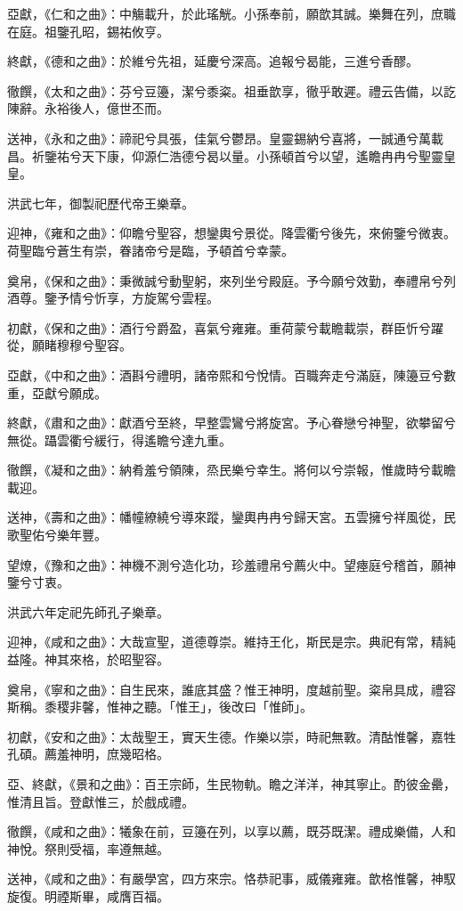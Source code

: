 亞獻，《仁和之曲》：中觴載升，於此瑤觥。小孫奉前，願歆其誠。樂舞在列，庶職在庭。祖鑒孔昭，錫祐攸亨。

終獻，《德和之曲》：於維兮先祖，延慶兮深高。追報兮曷能，三進兮香醪。

徹饌，《太和之曲》：芬兮豆籩，潔兮黍粢。祖垂歆享，徹乎敢遲。禮云告備，以訖陳辭。永裕後人，億世丕而。

送神，《永和之曲》：禘祀兮具張，佳氣兮鬱昂。皇靈錫納兮喜將，一誠通兮萬載昌。祈鑒祐兮天下康，仰源仁浩德兮曷以量。小孫頓首兮以望，遙瞻冉冉兮聖靈皇皇。

洪武七年，御製祀歷代帝王樂章。

迎神，《雍和之曲》：仰瞻兮聖容，想鑾輿兮景從。降雲衢兮後先，來俯鑒兮微衷。荷聖臨兮蒼生有崇，眷諸帝兮是臨，予頓首兮幸蒙。

奠帛，《保和之曲》：秉微誠兮動聖躬，來列坐兮殿庭。予今願兮效勤，奉禮帛兮列酒尊。鑒予情兮忻享，方旋駕兮雲程。

初獻，《保和之曲》：酒行兮爵盈，喜氣兮雍雍。重荷蒙兮載瞻載崇，群臣忻兮躍從，願睹穆穆兮聖容。

亞獻，《中和之曲》：酒斟兮禮明，諸帝熙和兮悅情。百職奔走兮滿庭，陳籩豆兮數重，亞獻兮願成。

終獻，《肅和之曲》：獻酒兮至終，早整雲鸞兮將旋宮。予心眷戀兮神聖，欲攀留兮無從。躡雲衢兮緩行，得遙瞻兮達九重。

徹饌，《凝和之曲》：納肴羞兮領陳，烝民樂兮幸生。將何以兮崇報，惟歲時兮載瞻載迎。

送神，《壽和之曲》：幡幢繚繞兮導來蹤，鑾輿冉冉兮歸天宮。五雲擁兮祥風從，民歌聖佑兮樂年豐。

望燎，《豫和之曲》：神機不測兮造化功，珍羞禮帛兮薦火中。望瘞庭兮稽首，願神鑒兮寸衷。

洪武六年定祀先師孔子樂章。

迎神，《咸和之曲》：大哉宣聖，道德尊崇。維持王化，斯民是宗。典祀有常，精純益隆。神其來格，於昭聖容。

奠帛，《寧和之曲》：自生民來，誰底其盛？惟王神明，度越前聖。粢帛具成，禮容斯稱。黍稷非馨，惟神之聽。「惟王」，後改曰「惟師」。

初獻，《安和之曲》：太哉聖王，實天生德。作樂以崇，時祀無斁。清酤惟馨，嘉牲孔碩。薦羞神明，庶幾昭格。

亞、終獻，《景和之曲》：百王宗師，生民物軌。瞻之洋洋，神其寧止。酌彼金罍，惟清且旨。登獻惟三，於戲成禮。

徹饌，《咸和之曲》：犧象在前，豆籩在列，以享以薦，既芬既潔。禮成樂備，人和神悅。祭則受福，率遵無越。

送神，《咸和之曲》：有嚴學宮，四方來宗。恪恭祀事，威儀雍雍。歆格惟馨，神馭旋復。明禋斯畢，咸膺百福。

